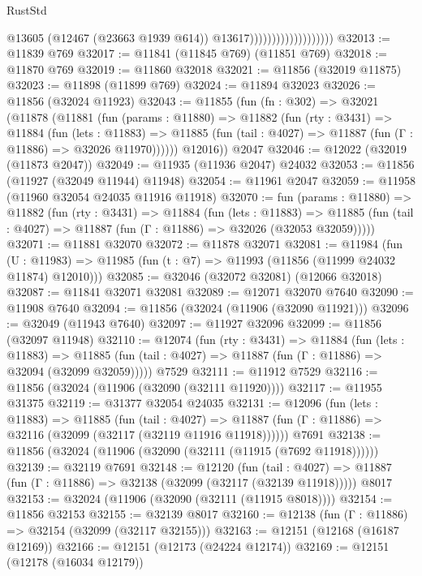 \begin{lexlean}{RustStd}
\begin{coremodule}
                                          @13605
                                          (@12467 (@23663 @1939 @614))
                                          @13617)))))))))))))))))))
@32013 := @11839 @769
@32017 := @11841 (@11845 @769) (@11851 @769)
@32018 := @11870 @769
@32019 := @11860 @32018
@32021 := @11856 (@32019 @11875)
@32023 := @11898 (@11899 @769)
@32024 := @11894 @32023
@32026 := @11856 (@32024 @11923)
@32043 := @11855
    (fun (fn : @302) =>
    @32021
      (@11878
        (@11881
          (fun (params : @11880) =>
          @11882
            (fun (rty : @3431) =>
            @11884
              (fun (lets : @11883) =>
              @11885 (fun (tail : @4027) => @11887 (fun (Γ : @11886) => @32026 @11970))))))
        @12016))
    @2047
@32046 := @12022 (@32019 (@11873 @2047))
@32049 := @11935 (@11936 @2047) @24032
@32053 := @11856 (@11927 (@32049 @11944) @11948)
@32054 := @11961 @2047
@32059 := @11958 (@11960 @32054 @24035 @11916 @11918)
@32070 := fun (params : @11880) =>
  @11882
    (fun (rty : @3431) =>
    @11884
      (fun (lets : @11883) =>
      @11885 (fun (tail : @4027) => @11887 (fun (Γ : @11886) => @32026 (@32053 @32059)))))
@32071 := @11881 @32070
@32072 := @11878 @32071
@32081 := @11984
    (fun (U : @11983) => @11985 (fun (t : @7) => @11993 (@11856 (@11999 @24032 @11874) @12010)))
@32085 := @32046 (@32072 @32081) (@12066 @32018)
@32087 := @11841 @32071 @32081
@32089 := @12071 @32070 @7640
@32090 := @11908 @7640
@32094 := @11856 (@32024 (@11906 (@32090 @11921)))
@32096 := @32049 (@11943 @7640)
@32097 := @11927 @32096
@32099 := @11856 (@32097 @11948)
@32110 := @12074
    (fun (rty : @3431) =>
    @11884
      (fun (lets : @11883) =>
      @11885 (fun (tail : @4027) => @11887 (fun (Γ : @11886) => @32094 (@32099 @32059)))))
    @7529
@32111 := @11912 @7529
@32116 := @11856 (@32024 (@11906 (@32090 (@32111 @11920))))
@32117 := @11955 @31375
@32119 := @31377 @32054 @24035
@32131 := @12096
    (fun (lets : @11883) =>
    @11885
      (fun (tail : @4027) =>
      @11887 (fun (Γ : @11886) => @32116 (@32099 (@32117 (@32119 @11916 @11918))))))
    @7691
@32138 := @11856 (@32024 (@11906 (@32090 (@32111 (@11915 (@7692 @11918))))))
@32139 := @32119 @7691
@32148 := @12120
    (fun (tail : @4027) => @11887 (fun (Γ : @11886) => @32138 (@32099 (@32117 (@32139 @11918)))))
    @8017
@32153 := @32024 (@11906 (@32090 (@32111 (@11915 @8018))))
@32154 := @11856 @32153
@32155 := @32139 @8017
@32160 := @12138 (fun (Γ : @11886) => @32154 (@32099 (@32117 @32155)))
@32163 := @12151 (@12168 (@16187 @12169))
@32166 := @12151 (@12173 (@24224 @12174))
@32169 := @12151 (@12178 (@16034 @12179))

\end{coremodule}
\end{lexlean}
